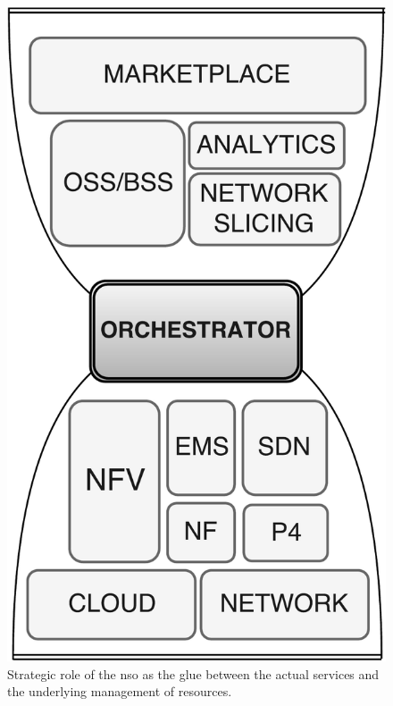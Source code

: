 \begin{figure}[t!]
  \centering
  \includegraphics[scale=.25]{Figures/01_Introduction/fig2.pdf}
    \caption{Strategic role of the \gls{nso} as the glue between the actual services and the underlying management of resources.}
    \label{orch}
\end{figure}

